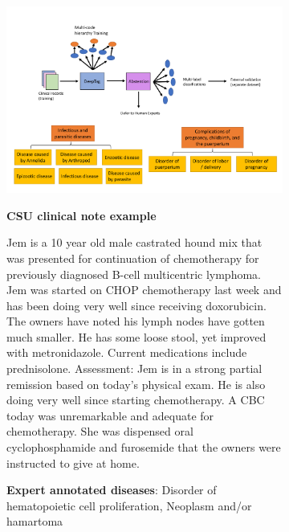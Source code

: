 \documentclass[fleqn,10pt]{wlscirep}
\begin{document}
\begin{figure}[h!]
    \begin{subfigure}[b]{\textwidth}
        \centering
        \includegraphics[scale=0.4]{combined-figure-1.pdf}
        \caption{}
        \label{fig:work-schematic}
    \end{subfigure}
    \hfill
    \begin{subfigure}[b]{\textwidth}
        \footnotesize
        \textbf{CSU clinical note example}
        \begin{framed}
        Jem is a 10 year old male castrated hound mix that was presented for continuation of chemotherapy for previously diagnosed B-cell multicentric lymphoma. Jem was started on CHOP chemotherapy last week and has been doing very well since receiving doxorubicin. The owners have noted his lymph nodes have gotten much smaller. He has some loose stool, yet improved with metronidazole. Current medications include prednisolone. Assessment: Jem is in a strong partial remission based on today's physical exam. He is also doing very well since starting chemotherapy. A CBC today was unremarkable and adequate for chemotherapy. She was dispensed oral cyclophosphamide and furosemide that the owners were instructed to give at home.
        \vspace{0.1in}
        
        \textbf{Expert annotated diseases}: Disorder of hematopoietic cell proliferation, Neoplasm and/or hamartoma
        \end{framed}
        

\end{subfigure}
\end{figure}
\end{document}
